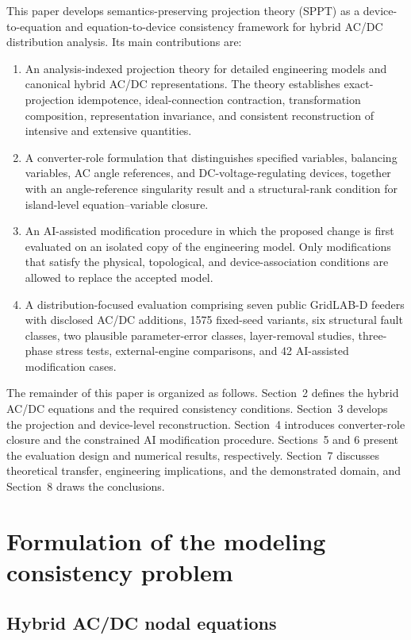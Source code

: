 \documentclass[final,5p,times,twocolumn]{elsarticle}
\begin{document}
This paper develops semantics-preserving projection theory (SPPT) as a
device-to-equation and equation-to-device consistency framework for hybrid
AC/DC distribution analysis. Its main contributions are:
\begin{enumerate}[leftmargin=1.7em,itemsep=2pt]
\item An analysis-indexed projection theory for detailed engineering models and
canonical hybrid AC/DC representations. The theory establishes exact-projection
idempotence, ideal-connection contraction, transformation composition,
representation invariance, and consistent reconstruction of intensive and
extensive quantities.
\item A converter-role formulation that distinguishes specified variables,
balancing variables, AC angle references, and DC-voltage-regulating devices,
together with an angle-reference singularity result and a structural-rank
condition for island-level equation--variable closure.
\item An AI-assisted modification procedure in which the proposed change is
first evaluated on an isolated copy of the engineering model. Only modifications
that satisfy the physical, topological, and device-association conditions are
allowed to replace the accepted model.
\item A distribution-focused evaluation comprising seven public GridLAB-D
feeders with disclosed AC/DC additions, 1575 fixed-seed variants, six structural
fault classes, two plausible parameter-error classes, layer-removal studies,
three-phase stress tests, external-engine comparisons, and 42 AI-assisted
modification cases.
\end{enumerate}
The remainder of this paper is organized as follows. Section~2 defines the
hybrid AC/DC equations and the required consistency conditions. Section~3
develops the projection and device-level reconstruction. Section~4 introduces
converter-role closure and the constrained AI modification procedure.
Sections~5 and 6 present the evaluation design and numerical results,
respectively. Section~7 discusses theoretical transfer, engineering
implications, and the demonstrated domain, and Section~8 draws the conclusions.

\section{Formulation of the modeling consistency problem}\label{sec:problem}

\subsection{Hybrid AC/DC nodal equations}
\end{document}

